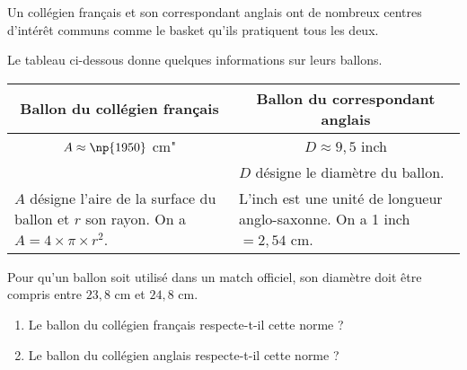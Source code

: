 
\medskip

Un collégien français et son correspondant anglais ont de nombreux
centres d'intérêt communs comme le basket qu'ils pratiquent tous les deux.

Le tableau ci-dessous donne quelques informations sur leurs ballons.

\begin{center}
\begin{tabularx}{\linewidth}{|X|X|}\hline
\multicolumn{1}{|c|}{Ballon du collégien français}& \multicolumn{1}{|c|}{Ballon du correspondant anglais}\\ \hline
\multicolumn{1}{|c|}{$A \approx \np{1950}$ cm"}& \multicolumn{1}{|c|}{$D \approx 9,5$ inch}\\ \hline
&$D$ désigne le diamètre du ballon.\\
$A$ désigne l'aire de la surface du ballon et $r$ son rayon. On a $A = 4 \times \pi \times r^2$.& L'inch est une unité de longueur anglo-saxonne.
On a 1 inch $= 2,54$ cm.\\ \hline
\end{tabularx}
\end{center}

Pour qu'un ballon soit utilisé dans un match officiel, son diamètre doit être compris
entre $23,8$ cm et $24,8$ cm.

\medskip

\begin{enumerate}
\item Le ballon du collégien français respecte-t-il cette norme ?
\item  Le ballon du collégien anglais respecte-t-il cette norme ?
\end{enumerate}

\bigskip

